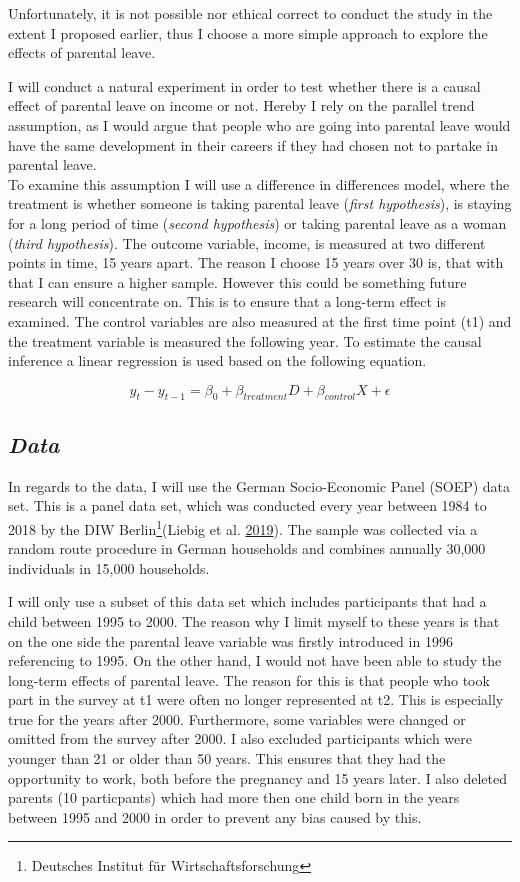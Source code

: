\documentclass[
  12pt,
]{article}
\begin{document}
Unfortunately, it is not possible nor ethical correct to conduct the study in the extent I proposed earlier, thus I choose a more simple approach to explore the effects of parental leave.

I will conduct a natural experiment in order to test whether there is a causal effect of parental leave on income or not. Hereby I rely on the parallel trend assumption, as I would argue that people who are going into parental leave would have the same development in their careers if they had chosen not to partake in parental leave.\\
To examine this assumption I will use a difference in differences model, where the treatment is whether someone is taking parental leave (\emph{first hypothesis}), is staying for a long period of time (\emph{second hypothesis}) or taking parental leave as a woman (\emph{third hypothesis}).
The outcome variable, income, is measured at two different points in time, 15 years apart. The reason I choose 15 years over 30 is, that with that I can ensure a higher sample. However this could be something future research will concentrate on. This is to ensure that a long-term effect is examined. The control variables are also measured at the first time point (t1) and the treatment variable is measured the following year.
To estimate the causal inference a linear regression is used based on the following equation.

\[y_t - y_{t-1} = \beta_0 + \beta_{treatment} D + \beta_{control} X + \epsilon \]

\hypertarget{data}{%
\subsection*{\texorpdfstring{\emph{Data}}{Data}}\label{data}}

In regards to the data, I will use the German Socio-Economic Panel (SOEP) data set. This is a panel data set, which was conducted every year between 1984 to 2018 by the DIW Berlin\footnote{Deutsches Institut für Wirtschaftsforschung}(Liebig et al. \protect\hyperlink{ref-liebig_socio-economic_2019}{2019}). The sample was collected via a random route procedure in German households and combines annually 30,000 individuals in 15,000 households.

I will only use a subset of this data set which includes participants that had a child between 1995 to 2000. The reason why I limit myself to these years is that on the one side the parental leave variable was firstly introduced in 1996 referencing to 1995.
On the other hand, I would not have been able to study the long-term effects of parental leave. The reason for this is that people who took part in the survey at t1 were often no longer represented at t2.
This is especially true for the years after 2000. Furthermore, some variables were changed or omitted from the survey after 2000.
I also excluded participants which were younger than 21 or older than 50 years. This ensures that they had the opportunity to work, both before the pregnancy and 15 years later. I also deleted parents (10 particpants) which had more then one child born in the years between 1995 and 2000 in order to prevent any bias caused by this.
\end{document}
